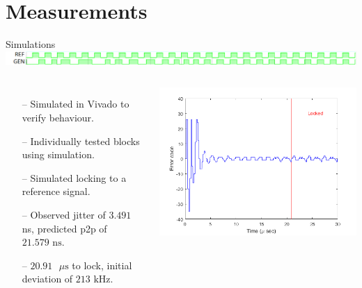 \documentclass{beamer}
\begin{document}
\section*{Measurements}
\begin{frame}{Simulations}
	\vspace*{-10mm}
 		\includegraphics[scale=0.36]{../vivado_sim}
	\begin{columns}
    \begin{itemize}
	    \item[--]
	        Simulated in Vivado to verify behaviour.
	    \item[--]
	        Individually tested blocks using simulation.
	    \item[--]
	        Simulated locking to a reference signal.
	    \item[--]
            Observed jitter of $3.491$ ns, predicted p2p of $21.579\textrm{ ns}$.
	    \item[--]
            $20.91\textrm{ }\mu\textrm{s}$ to lock, initial deviation of $213\textrm{ kHz}$.
	\end{itemize}
	
	\includegraphics[scale=0.4125]{../sim_locking}
	\end{columns}

\end{frame}
\end{document}
